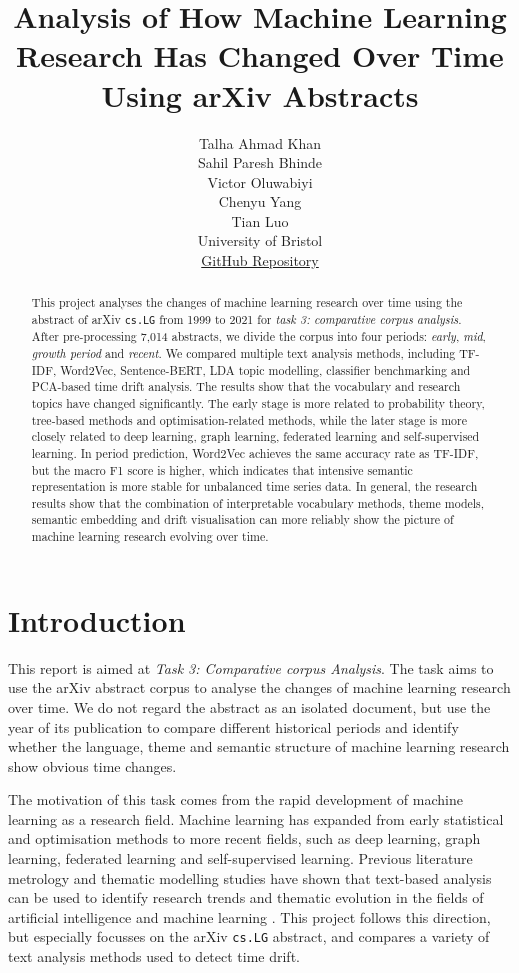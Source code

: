 \documentclass[11pt]{article}
\title{Analysis of How Machine Learning Research Has Changed Over Time Using arXiv Abstracts}
\author{
\begin{tabular}{c}
Talha Ahmad Khan \\
Sahil Paresh Bhinde \\
Victor Oluwabiyi \\
Chenyu Yang \\
Tian Luo \\
University of Bristol\\
\href{https://github.com/Kyl1ss/ai-text-analytics-task3.git}{GitHub Repository}
\end{tabular}
}
\date{}
\begin{document}
\maketitle

\begin{abstract}
\noindent
This project analyses the changes of machine learning research over time using the abstract of arXiv \texttt{cs.LG} from 1999 to 2021 for \textit{task 3: comparative corpus analysis}. After pre-processing 7,014 abstracts, we divide the corpus into four periods: \textit{early}, \textit{mid}, \textit{growth period} and \textit{recent}. We compared multiple text analysis methods, including TF-IDF, Word2Vec, Sentence-BERT, LDA topic modelling, classifier benchmarking and PCA-based time drift analysis. The results show that the vocabulary and research topics have changed significantly. The early stage is more related to probability theory, tree-based methods and optimisation-related methods, while the later stage is more closely related to deep learning, graph learning, federated learning and self-supervised learning. In period prediction, Word2Vec achieves the same accuracy rate as TF-IDF, but the macro F1 score is higher, which indicates that intensive semantic representation is more stable for unbalanced time series data. In general, the research results show that the combination of interpretable vocabulary methods, theme models, semantic embedding and drift visualisation can more reliably show the picture of machine learning research evolving over time.
\end{abstract}


\section{Introduction}

This report is aimed at \textit{Task 3: Comparative corpus Analysis}. The task aims to use the arXiv abstract corpus to analyse the changes of machine learning research over time. We do not regard the abstract as an isolated document, but use the year of its publication to compare different historical periods and identify whether the language, theme and semantic structure of machine learning research show obvious time changes.

The motivation of this task comes from the rapid development of machine learning as a research field. Machine learning has expanded from early statistical and optimisation methods to more recent fields, such as deep learning, graph learning, federated learning and self-supervised learning. Previous literature metrology and thematic modelling studies have shown that text-based analysis can be used to identify research trends and thematic evolution in the fields of artificial intelligence and machine learning \cite{li2020,su2021,yu2023}. This project follows this direction, but especially focusses on the arXiv \texttt{cs.LG} abstract, and compares a variety of text analysis methods used to detect time drift.
\end{document}
